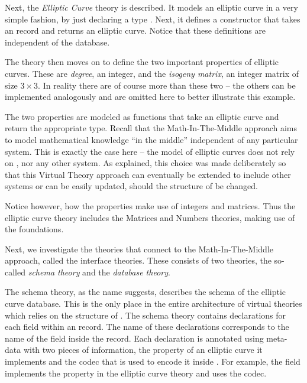 Next, the \textit{Elliptic Curve} theory is described. 
It models an elliptic curve in a very simple fashion, by just declaring a type . 
Next, it defines a  constructor that takes an \mmt record and returns an elliptic curve. 
Notice that these definitions are independent of the \lmfdb database. 

The theory then moves on to define the two important properties of elliptic curves. 
These are \textit{degree}, an integer, and the \textit{isogeny matrix}, an integer matrix of size $3 \times 3$. 
In reality there are of course more than these two -- the others can be implemented analogously and are omitted here to better illustrate this example. 

The two properties are modeled as functions that take an elliptic curve and return the appropriate type. 
Recall that the Math-In-The-Middle approach aims to model mathematical knowledge ``in the middle'' independent of any particular system.  
This is exactly the case here -- the model of elliptic curves does not rely on \lmfdb, nor any other system. 
As explained, this choice was made deliberately so that this Virtual Theory approach can eventually be extended to include other systems or can be easily updated, should the structure of \lmfdb be changed. 

Notice however, how the properties make use of integers and matrices. 
Thus the elliptic curve theory includes the Matrices and Numbers theories, making use of the foundations. 

Next, we investigate the theories that connect \lmfdb to the Math-In-The-Middle approach, called the interface theories. 
These consists of two theories, the so-called \textit{schema theory} and the \textit{database theory}. 

The schema theory, as the name suggests, describes the schema of the \lmfdb elliptic curve database. 
This is the only place in the entire architecture of virtual theories which relies on the structure of \lmfdb. 
The schema theory contains declarations for each field within an \lmfdb record. 
The name of these declarations corresponds to the name of the field inside the record. 
Each declaration is annotated using \mmt meta-data with two pieces of information, the property of an elliptic curve it implements and the codec that is used to encode it inside \lmfdb. 
For example, the  field implements the  property in the elliptic curve theory and uses the  codec. 

